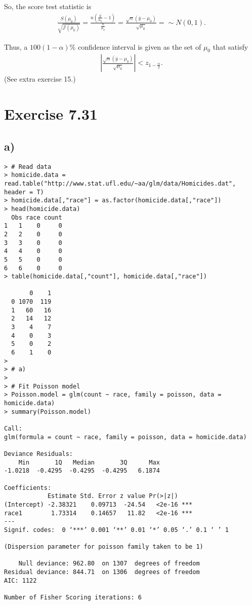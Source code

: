 \documentclass[a4paper]{article}
\begin{document}
So, the score test statistic is
\begin{align*}
\frac{S(\mu_{0})}{\sqrt{\mathcal{J}(\mu_{0})}} = \frac{n\left(\frac{\overline{y}}{\mu_{0}}-1\right)}{\frac{n}{\mu_{0}}} = \frac{\sqrt{n}(\overline{y}-\mu_{0})}{\sqrt{\mu_{0}}} = \sim N(0,1).
\end{align*}

Thus, a $100(1-\alpha)\%$ confidence interval is given as the set of $\mu_{0}$ that satisfy
\begin{align*}
\left|\frac{\sqrt{n}(\overline{y}-\mu_{0})}{\sqrt{\mu_{0}}}\right| < z_{1-\frac{\alpha}{2}}.
\end{align*}
(See extra exercise 15.)



\vspace{\baselineskip}
\section{Exercise 7.31}
\subsection{a)}

\begin{lstlisting}
> # Read data
> homicide.data = read.table("http://www.stat.ufl.edu/~aa/glm/data/Homicides.dat", header = T)
> homicide.data[,"race"] = as.factor(homicide.data[,"race"])
> head(homicide.data)
  Obs race count
1   1    0     0
2   2    0     0
3   3    0     0
4   4    0     0
5   5    0     0
6   6    0     0
> table(homicide.data[,"count"], homicide.data[,"race"])
   
       0    1
  0 1070  119
  1   60   16
  2   14   12
  3    4    7
  4    0    3
  5    0    2
  6    1    0
> 
> # a)
> 
> # Fit Poisson model
> Poisson.model = glm(count ~ race, family = poisson, data = homicide.data)
> summary(Poisson.model)

Call:
glm(formula = count ~ race, family = poisson, data = homicide.data)

Deviance Residuals: 
    Min       1Q   Median       3Q      Max  
-1.0218  -0.4295  -0.4295  -0.4295   6.1874  

Coefficients:
            Estimate Std. Error z value Pr(>|z|)    
(Intercept) -2.38321    0.09713  -24.54   <2e-16 ***
race1        1.73314    0.14657   11.82   <2e-16 ***
---
Signif. codes:  0 ‘***’ 0.001 ‘**’ 0.01 ‘*’ 0.05 ‘.’ 0.1 ‘ ’ 1

(Dispersion parameter for poisson family taken to be 1)

    Null deviance: 962.80  on 1307  degrees of freedom
Residual deviance: 844.71  on 1306  degrees of freedom
AIC: 1122

Number of Fisher Scoring iterations: 6
\end{lstlisting}
\end{document}
